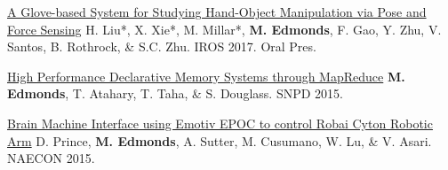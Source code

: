 \begin{cvpublications}
\item \cvpublication
{\href{http://www.mjedmonds.com/papers/IROS17_GloveHardware_final.pdf}{A Glove-based System for Studying Hand-Object Manipulation via Pose and Force Sensing}} %
{H. Liu*, X. Xie*, M. Millar*, \textbf{M. Edmonds}, F. Gao, Y. Zhu, V. Santos, B. Rothrock, \& S.C. Zhu.} %
{IROS 2017.} %
{Oral Pres.} %

\item \cvpublication
{\href{http://www.mjedmonds.com/papers/SNPD_2015_HighPerformanceDM_final.pdf}{High Performance Declarative Memory Systems through MapReduce}} %
{\textbf{M. Edmonds}, T. Atahary, T. Taha, \& S. Douglass.} %
{SNPD 2015.} %
{} %


\item \cvpublication
{\href{http://www.mjedmonds.com/papers/bmi-using-emotiv.pdf}{Brain Machine Interface using Emotiv EPOC to control Robai Cyton Robotic Arm}} %
{D. Prince, \textbf{M. Edmonds}, A. Sutter, M. Cusumano, W. Lu, \& V. Asari.} %
{NAECON 2015.} %
{} %

\cvequalcontribution

\end{cvpublications}